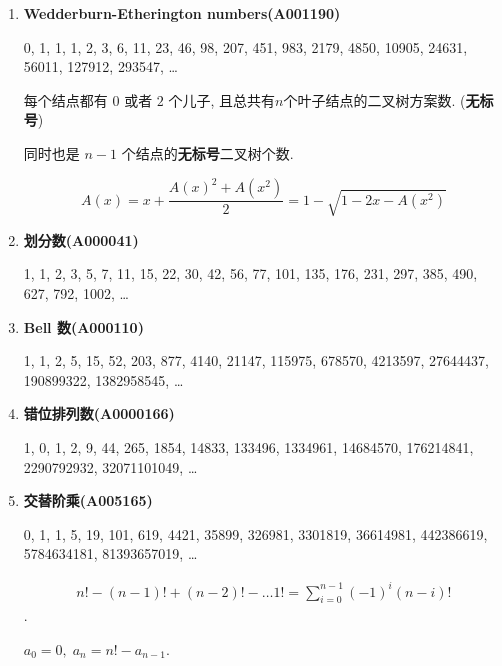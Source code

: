 \begin{enumerate}
          1, 1, 2, 8, 48, 352, 2880, 25216, 231168, 2190848, 21292032, 211044352, 2125246464, 21681954816, \dots

          \( a_n = 2^n s_{n - 2} \; (n > 2) \), \(s_n\) 是上面的小 Schr\"oder 数.

          和上面的区别在于, 这里可以不连满 \(n-1\) 条边. 另外 Motzkin 数画的弦不能共享端点, 但是这里可以.

    \item \textbf{Wedderburn-Etherington numbers(A001190)}

          0, 1, 1, 1, 2, 3, 6, 11, 23, 46, 98, 207, 451, 983, 2179, 4850, 10905, 24631, 56011, 127912, 293547, \dots

          每个结点都有 \(0\) 或者 \(2\) 个儿子, 且总共有\(n\)个叶子结点的二叉树方案数. (\textbf{无标号})

          同时也是 \(n-1\) 个结点的\textbf{无标号}二叉树个数.

          \[
              A(x) = x + \frac {A(x) ^ 2 + A(x ^ 2)} 2 = 1 - \sqrt{1 - 2x - A(x ^ 2)}
          \]

    \item \textbf{划分数(A000041)}

          1, 1, 2, 3, 5, 7, 11, 15, 22, 30, 42, 56, 77, 101, 135, 176, 231, 297, 385, 490, 627, 792, 1002, \dots

    \item \textbf{Bell 数(A000110)}

          1, 1, 2, 5, 15, 52, 203, 877, 4140, 21147, 115975, 678570, 4213597, 27644437, 190899322, 1382958545, \dots

    \item \textbf{错位排列数(A0000166)}

          1, 0, 1, 2, 9, 44, 265, 1854, 14833, 133496, 1334961, 14684570, 176214841, 2290792932, 32071101049, \dots

    \item \textbf{交替阶乘(A005165)}

          0, 1, 1, 5, 19, 101, 619, 4421, 35899, 326981, 3301819, 36614981, 442386619, 5784634181, 81393657019, \dots

          \[
              \begin{aligned} n! - (n - 1)! + (n - 2)! - \dots 1! = \sum_{i = 0} ^ {n - 1} (-1)^i (n - i)! \end{aligned}
          \].

          \( a_0 = 0,\; a_n = n! - a_{n - 1} \).
\end{enumerate}

